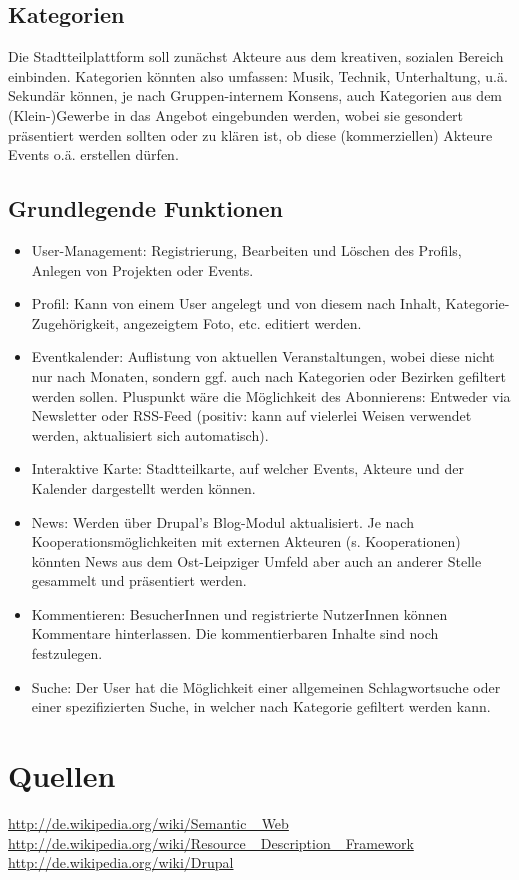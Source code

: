 \documentclass{swp}
\begin{document}
\subsection{Kategorien}
Die Stadtteilplattform soll zun\"achst Akteure aus dem kreativen, sozialen Bereich einbinden. Kategorien k\"onnten also umfassen: Musik, Technik, Unterhaltung, u.\"a. Sekund\"ar k\"onnen, je nach Gruppen-internem Konsens, auch Kategorien aus dem (Klein-)Gewerbe in das Angebot eingebunden werden, wobei sie gesondert pr\"asentiert werden sollten oder zu kl\"aren ist, ob diese (\glqq kommerziellen\grqq{}) Akteure Events o.\"a. erstellen d\"urfen.
\subsection{Grundlegende Funktionen}
\begin{itemize}
\item User-Management: Registrierung, Bearbeiten und L\"oschen des Profils, Anlegen von Projekten oder Events.
\item Profil: Kann von einem User angelegt und von diesem nach Inhalt, Kategorie-Zugeh\"origkeit, angezeigtem Foto, etc. editiert werden.
\item Eventkalender: Auflistung von aktuellen Veranstaltungen, wobei diese nicht nur nach Monaten, sondern ggf. auch nach Kategorien oder Bezirken gefiltert werden sollen. Pluspunkt w\"are die M\"oglichkeit des Abonnierens: Entweder via Newsletter oder RSS-Feed (positiv: kann auf vielerlei Weisen verwendet werden, aktualisiert sich automatisch).
\item Interaktive Karte: Stadtteilkarte, auf welcher Events, Akteure und der Kalender dargestellt werden k\"onnen.
\item News: Werden \"uber Drupal's Blog-Modul aktualisiert. Je nach Kooperationsm\"oglichkeiten mit externen Akteuren (s. \glqq Kooperationen\grqq{}) k\"onnten News aus dem Ost-Leipziger Umfeld aber auch an anderer Stelle gesammelt und pr\"asentiert werden.
\item Kommentieren: BesucherInnen und registrierte NutzerInnen k\"onnen Kommentare hinterlassen. Die kommentierbaren Inhalte sind noch festzulegen.
\item Suche: Der User hat die M\"oglichkeit einer allgemeinen Schlagwortsuche oder einer spezifizierten Suche, in welcher nach Kategorie gefiltert werden kann.
\end{itemize}

\section{Quellen}
\url{http://de.wikipedia.org/wiki/Semantic\_ Web}\\
\url{http://de.wikipedia.org/wiki/Resource\_ Description\_ Framework}\\
\url{http://de.wikipedia.org/wiki/Drupal}
\end{document}
